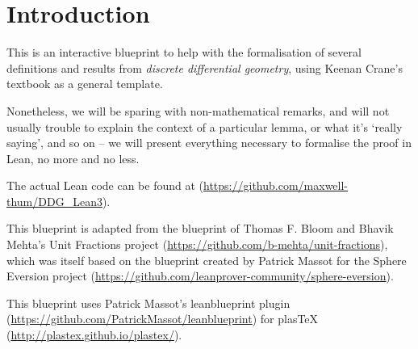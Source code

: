 \chapter*{Introduction}
\label{cha:intro}

This is an interactive blueprint to help with 
the formalisation of several definitions and results
from \emph{discrete differential geometry}, using 
Keenan Crane's textbook as a general template.

Nonetheless, we will be sparing with non-mathematical remarks, and will not usually trouble to explain the context of a particular lemma, or what it's `really saying', and so on -- we will present everything necessary to formalise the proof in Lean, no more and no less.

The actual Lean code can be found at (\url{https://github.com/maxwell-thum/DDG_Lean3}). %

This blueprint is adapted from the blueprint of Thomas F. Bloom and Bhavik Mehta's Unit Fractions project (\url{https://github.com/b-mehta/unit-fractions}), which was itself based on the blueprint created by Patrick Massot for the Sphere Eversion project (\url{https://github.com/leanprover-community/sphere-eversion}).

This blueprint uses Patrick Massot's leanblueprint plugin (\url{https://github.com/PatrickMassot/leanblueprint}) for plasTeX (\url{http://plastex.github.io/plastex/}). 

